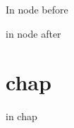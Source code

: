 \documentclass{book}
\begin{document}
\label{anchor:node-before}%

In node before

\label{anchor:after}%

in node after

\chapter{chap}
\label{anchor:chap}%

in chap
\end{document}
